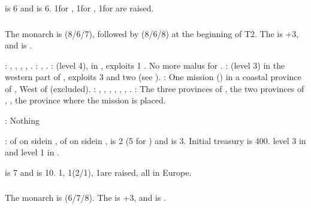 \aparag {} is 6 and  is
6. 1\ARMY\faceplus for \paysmajeurPologne, 1\ARMY\faceplus for \paysLithuanie,
1\ARMY\facemoins for \paysUkraine are raised.


\subsubsection{\paysmajeurPortugal}
\aparag The monarch is  (8/6/7), followed by
 (8/6/8) at the beginning of T2. The \STAB is +3, and \POR
is .

: , \provinceBeira,
\provinceTejo, \provinceAlentejo, \provinceAlgarve.
: \provinceTanger, \provinceAcores.
:  (level 4), in
, exploits 1 . No more malus for
\COLaction.
: \constructionElmina (level 3) in the western part
of \granderegionCotedor, exploits 3  and two  (see
).
: One mission () in a
coastal province of \continentAfrica, West of \granderegionCap (excluded).
: \seazoneAcores, \seazoneCanarias, \seazoneArguin,
\seazoneGambie, \seazoneGuinee, \seazoneAngola, .
: The three provinces of \granderegionCameroun, the
two provinces of \granderegionCotedor, , the province
where the mission is placed.

: Nothing

:
\bparag \MNU of  on side\facemoins in \provinceTejo, \MNU of
 on side\facemoins in , \FTI is 2 (5 for
\ROTW) and \DTI is 3.
\bparag Initial treasury is 400\ducats.
\bparag \TradeFLEET level 3 in  and level 1 in .

\aparag {} is 7 and  is
10. 1\ARMY\facemoins, 1\FLEET\facemoins (2\NWD/1\NTD), 1\LD are raised, all in
Europe.


\subsubsection{\paysmajeurRussie}
\aparag The monarch is  (6/7/8). The \STAB is +3, and \RUS
is .

